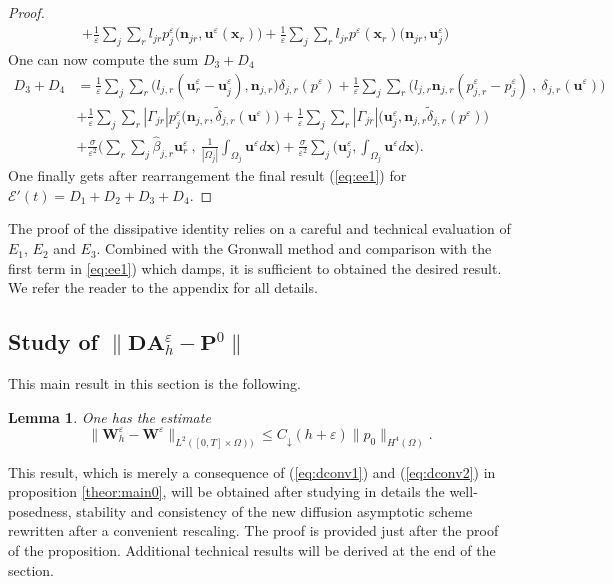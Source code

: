 \documentclass[a4paper,french,english,10pt]{article}
\newcommand\ljr{l_{jr}}
\newcommand\njr{\mathbf{n}_{jr}}
\newcommand\uu{\mathbf{u}}
\newcommand\eps{\varepsilon}
\newcommand\x{\mathbf{x}}
\newcommand\W{\mathbf{W}}
\newtheorem{lemma}[theorem]{Lemma}
\begin{document}
\begin{proof}
$$\begin{aligned}
&+ \frac{1}{\eps}
\sum_j \sum_r  l_{jr} p_j^{\eps} \big( \njr ,\uu^{\eps}(\textbf{x}_{r}) \big)
 + \frac{1}{\eps}\sum_j \sum_r \ljr p^{\eps}(\textbf{x}_{r})\big(\njr ,\textbf{u}_j^{\eps}\big) 
\end{aligned}
$$
One can now compute the sum  $D_3+D_4$
\begin{equation*}
\begin{aligned}
D_3+D_4 &= \frac{1}{\eps} \sum_j \sum_r \bigg(
l_{j,r}(\textbf{u}_r^{\eps}-\textbf{u}_j^{\eps}),\textbf{n}_{j,r} \bigg)
\delta_{j,r}(p^{\eps}) +\frac{1}{\eps} \sum_j \sum_r \bigg( 
 l_{j,r}\textbf{n}_{j,r}  (p_{j,r}^{\eps}- p_j^{\eps})  \: , \:
\delta_{j,r}(\uu^{\eps}) \bigg) \\
&+\frac{1}{\eps}\sum_j \sum_r  |\Gamma_{jr}|
p_j^{\eps}
\bigg(\textbf{n}_{j,r},\tilde{\delta}_{j,r}(\uu^{\eps}) \bigg) +
\frac{1}{\eps}\sum_j \sum_r  |\Gamma_{jr}| \bigg( \textbf{u}_j^{\eps} , \textbf{n}_{j,r}
\tilde{\delta}_{j,r}(p^{\eps})\bigg)\\
&+\frac{\sigma}{\eps^2} \bigg( \sum_r \sum_j \widehat{\beta}_{j,r}\textbf{u}_r^{\eps}
 \: , \: \frac{1}{|\Omega_j|}\int_{\Omega_j} \uu^{\eps} d\x \bigg)
+\frac{\sigma}{\eps^2}\sum_j \bigg(  \textbf{u}_j^{\eps} ,
\int_{\Omega_j}\uu^{\eps} d\x\bigg).
\end{aligned}
\end{equation*}
One finally gets after rearrangement
the final result (\ref{eq:ee1}) for $\mathscr{E}'(t)
=D_1+D_2+D_3 +D_4$.
\end{proof}

The proof of the dissipative identity relies on a careful and technical evaluation of $E_1$, $E_2$ and $E_3$.
Combined with the Gronwall method and comparison with the first term in 
\ref{eq:ee1}) which 
damps, it is sufficient to obtained the desired result.
We refer the reader to the appendix for all details. 

\subsection{Study of $\| \mathbf D \mathbf A_h^\varepsilon
 - \mathbf P^0\|$}


This main result in this section is the following.

\begin{lemma} \label{lemme:tiptop}
One has the estimate
\begin{equation} \label{eq:enc1}
\| \mathbf W_h^\eps  -\W^\eps \|_{L^2([0,T]\times  \Omega)   )   }\leq  C_\downarrow (h+\eps)  \|  p_0  \|_{H^4(\Omega)}   . %
\end{equation}
\end{lemma}
This result, which is merely a consequence of  (\ref{eq:dconv1}) and (\ref{eq:dconv2})
in proposition  \ref{theor:main0},
will be obtained after studying in details the well-posedness,
stability and consistency of the new diffusion asymptotic scheme rewritten after a convenient rescaling.
The proof is provided just after the proof of the proposition.
Additional technical results will be derived at the end of the section.
\end{document}
